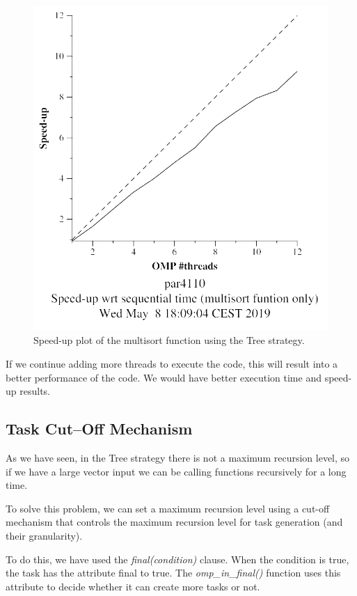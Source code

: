 \documentclass[12pt, a4paper]{article}
\begin{document}
\begin{figure}[H]
\begin{minipage}[b]{0.4\linewidth}
  \includegraphics[scale=0.5]{./S2/S2_strong_scalability/multisort-omp-strong_boada-3_tree_multisort_only}
  \caption{Speed-up plot of the multisort function using the Tree strategy.}
  \label{fig:mandel-omp-10000-strong-21-speedup}
\end{minipage}
\end{figure}

If we continue adding more threads to execute the code, this will result into a better performance of the code. We would have better execution time and speed-up results.

\subsection{Task Cut–Off Mechanism}

As we have seen, in the Tree strategy there is not a maximum recursion level, so if we have a large vector input we can be calling functions recursively for a long time.

To solve this problem, we can set a maximum recursion level using a cut-off mechanism that controls the maximum recursion level for task generation (and their granularity).

To do this, we have used the \textit{final(condition)} clause. When the condition is true, the task has the attribute final to true. The \textit{omp\_in\_final()} function uses this attribute to decide whether it can create more tasks or not.
\end{document}

